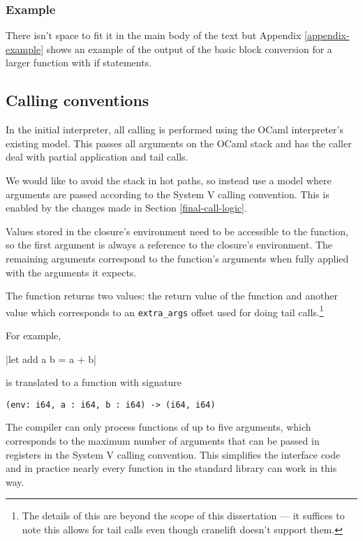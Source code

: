\subsubsection{Example}

There isn't space to fit it in the main body of the text but Appendix \ref{appendix-example} shows
an example of the output of the basic block conversion for a larger function with if statements.

\subsection{Calling conventions} \label{calling-conventions}

In the initial interpreter, all calling is performed using the OCaml interpreter's existing model.
This
passes all arguments on the OCaml stack and has the caller deal with partial application and tail
calls.

We would like to avoid the stack in hot paths, so instead use a model where arguments are passed
according to the
System V calling convention. This is enabled by the changes made in Section \ref{final-call-logic}.

Values stored in the closure's environment need to be accessible to the function, so the first
argument is always a reference to the closure's environment. The remaining arguments correspond to
the function's arguments when fully applied with the arguments it expects.

The function returns two values: the return value of the function and another value which
corresponds to an \texttt{extra\_args} offset used for doing tail calls.\footnote{
      The details of this are beyond the scope of this dissertation --- it suffices to note this
      allows for tail calls even though cranelift doesn't support them.}

For example,

|let add a b = a + b|

is translated to a function with signature

\begin{verbatim}
(env: i64, a : i64, b : i64) -> (i64, i64)
\end{verbatim}

The compiler can only process functions of up to five arguments, which corresponds to the maximum
number of arguments that can be passed in registers in the System V calling convention. This
simplifies the interface code and in practice nearly every function in the standard library can
work in this way.

